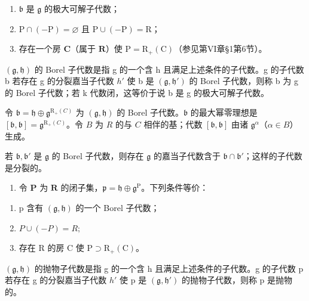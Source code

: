 \begin{enumerate}
\def\labelenumi{(\roman{enumi})}
\item
  \(\mathfrak{b}\) 是 \(\mathfrak{g}\) 的极大可解子代数；
\item
  \(\mathrm{P} \cap (-\mathrm{P}) = \varnothing\) 且 \(\mathrm{P} \cup (-\mathrm{P}) = \mathrm{R}\)；
\item
  存在一个房 \(\mathbf{C}\)（属于 \(\mathbf{R}\)）使 \(\mathrm{P} = \mathrm{R}_{+}(\mathrm{C})\)（参见第VI章§1第6节）。
\end{enumerate}

\((\mathfrak{g},\mathfrak{h})\) 的 Borel 子代数是指 g 的一个含 h 且满足上述条件的子代数。g 的子代数 b 若存在 g 的分裂嘉当子代数 \(h'\) 使 b 是 \((\mathfrak{g},\mathfrak{h}')\) 的 Borel 子代数，则称 b 为 g 的 Borel 子代数；若 k 代数闭，这等价于说 b 是 g 的极大可解子代数。

令 \(\mathfrak{b} = \mathfrak{h} \oplus \mathfrak{g}^{\mathrm{R}_{+}(C)}\) 为 \((\mathfrak{g}, \mathfrak{h})\) 的 Borel 子代数。\(\mathfrak{b}\) 的最大幂零理想是 \([\mathfrak{b}, \mathfrak{b}] = \mathfrak{g}^{\mathrm{R}_{+}(C)}\)。令 \(B\) 为 \(R\) 的与 \(C\) 相伴的基；代数 \([\mathfrak{b}, \mathfrak{b}]\) 由诸 \(\mathfrak{g}^{\alpha}\)（\(\alpha \in B\)）生成。

若 \(\mathfrak{b},\mathfrak{b}'\) 是 \(\mathfrak{g}\) 的 Borel 子代数，则存在 \(\mathfrak{g}\) 的嘉当子代数含于 \(\mathfrak{b} \cap \mathfrak{b}'\)；这样的子代数是分裂的。

\begin{enumerate}
\def\labelenumi{\arabic{enumi})}
\setcounter{enumi}{14}
\tightlist
\item
  令 \(\mathbf{P}\) 为 \(\mathbf{R}\) 的闭子集，\(\mathfrak{p} = \mathfrak{h} \oplus \mathfrak{g}^{\mathrm{P}}\)。下列条件等价：
\end{enumerate}

\begin{enumerate}
\def\labelenumi{(\roman{enumi})}
\item
  p 含有 \((\mathfrak{g}, \mathfrak{h})\) 的一个 Borel 子代数；
\item
  \(P \cup (-P) = R;\)
\item
  存在 R 的房 C 使 \(\mathrm{P} \supset \mathrm{R}_{+}(\mathrm{C})\)。
\end{enumerate}

\((\mathfrak{g},\mathfrak{h})\) 的抛物子代数是指 g 的一个含 h 且满足上述条件的子代数。g 的子代数 p 若存在 g 的分裂嘉当子代数 \(h'\) 使 p 是 \((\mathfrak{g},\mathfrak{h}')\) 的抛物子代数，则称 p 是抛物的。

